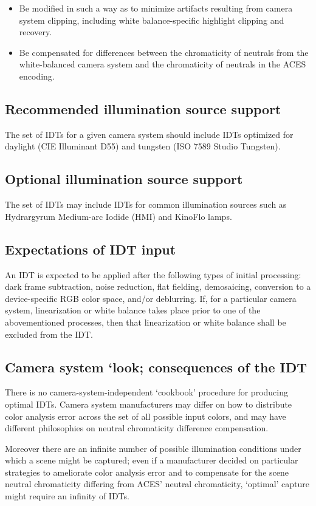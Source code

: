 \begin{itemize}
    \item	Be modified in such a way as to minimize artifacts resulting from camera system clipping, including white balance-specific highlight clipping and recovery.
    \item	Be compensated for differences between the chromaticity of neutrals from the white-balanced camera system and the chromaticity of neutrals in the ACES encoding.
\end{itemize}

\subsection{Recommended illumination source support}
The set of IDTs for a given camera system should include IDTs optimized for daylight (CIE Illuminant D55) and tungsten (ISO 7589 Studio Tungsten).

\subsection{Optional illumination source support}
The set of IDTs may include IDTs for common illumination sources such as Hydrargyrum Medium-arc Iodide (HMI) and KinoFlo\textsuperscript{\textregistered{}} lamps.

\subsection{Expectations of IDT input}
An IDT is expected to be applied after the following types of initial processing: dark frame subtraction, noise reduction, flat fielding, demosaicing, conversion to a device-specific RGB color space, and/or deblurring. If, for a particular camera system, linearization or white balance takes place prior to one of the abovementioned processes, then that linearization or white balance shall be excluded from the IDT.

\subsection{Camera system `look; consequences of the IDT}
There is no camera-system-independent `cookbook' procedure for producing optimal IDTs. Camera system manufacturers may differ on how to distribute color analysis error across the set of all possible input colors, and may have different philosophies on neutral chromaticity difference compensation.

Moreover there are an infinite number of possible illumination conditions under which a scene might be captured; even if a manufacturer decided on particular strategies to ameliorate color analysis error and to compensate for the scene neutral chromaticity differing from ACES' neutral chromaticity, `optimal' capture might require an infinity of IDTs.

